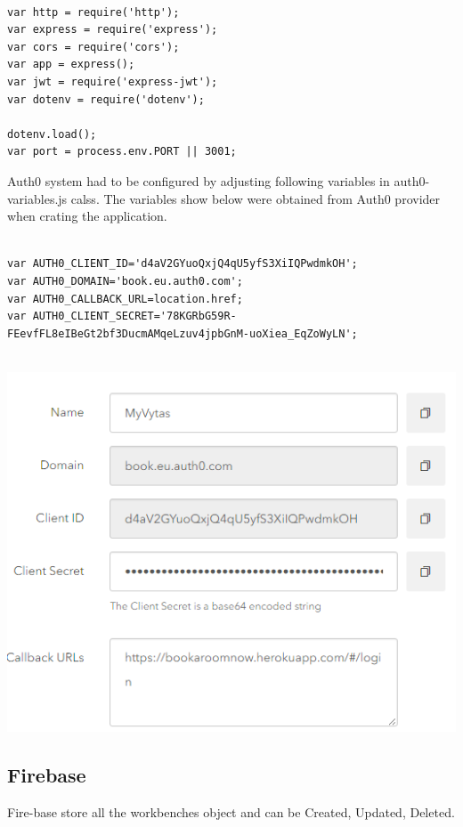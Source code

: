 \begin{itemize}
\begin{verbatim}

var http = require('http');
var express = require('express');
var cors = require('cors');
var app = express();
var jwt = require('express-jwt');
var dotenv = require('dotenv');

dotenv.load();
var port = process.env.PORT || 3001;

\end{verbatim}

\bigbreak

Auth0 system had to be configured by adjusting following variables in auth0-variables.js calss. The variables show below were obtained from Auth0 provider when crating the application.

\begin{verbatim}

var AUTH0_CLIENT_ID='d4aV2GYuoQxjQ4qU5yfS3XiIQPwdmkOH';
var AUTH0_DOMAIN='book.eu.auth0.com';
var AUTH0_CALLBACK_URL=location.href;
var AUTH0_CLIENT_SECRET='78KGRbG59R-
FEevfFL8eIBeGt2bf3DucmAMqeLzuv4jpbGnM-uoXiea_EqZoWyLN';


\end{verbatim}
\begin{center}    
	\includegraphics{img/AuthProfile.png}
\end{center}


\pagebreak
\subsection{Firebase}
\bigbreak
Fire-base store all the workbenches object and can be Created, Updated, Deleted.


\end{itemize}
